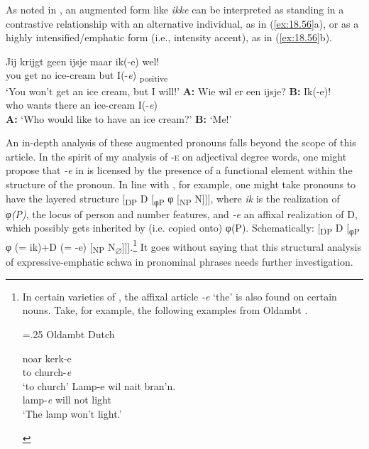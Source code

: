 \documentclass[output=paper]{langsci/langscibook}
\begin{document}
As noted in \citet{Zwart2001}, an augmented form like \emph{ikke} can be
interpreted as standing in a contrastive relationship with an alternative
individual, as in (\ref{ex:18.56}a), or as a highly intensified/emphatic
form (i.e., intensity accent), as in (\ref{ex:18.56}b).

\ea%
    \label{ex:18.56}
	\ea
	\gll Jij   krijgt    geen  ijsje            maar  ik(-e)    wel!\\
		you  get        no      ice-cream  but      I(-\emph{e})      \Ptcl{}\textsubscript{positive}\\
	\glt \enquote*{You won}t get an ice cream, but I will!'
	\ex
	\gll \textbf{A:} Wie    wil        er        een    ijsje?            \textbf{B:}  Ik(-e)!\\
		{}  who    wants    there  an    ice-cream    {}  I(-\emph{e})\\
	\glt \textbf{A:} \enquote*{Who would like to have an ice cream?} \textbf{B:} \enquote*{Me!}
	\z
\z

An in-depth analysis of these augmented pronouns falls beyond the scope of this
article. In the spirit of my analysis of \textsc{-e} on adjectival degree
words, one might propose that \emph{-e} in  is licensed by the
presence of a functional element within the structure of the pronoun. In line
with \citet{DechWil2002}, for example, one might take pronouns to
have the layered structure [\textsubscript{DP} D [\textsubscript{φP} φ
[\textsubscript{NP} N]]], where \emph{ik} is the realization of \emph{φ(P)},
the locus of person and number features, and \emph{-e} an affixal realization
of D, which possibly gets inherited by (i.e. copied onto) φ(P). Schematically:
[\textsubscript{DP} D [\textsubscript{φP} φ (= ik)+D (= -e) [\textsubscript{NP}
N\textsubscript{${\varnothing}$}]]].\footnote{In certain varieties of
    , the affixal article \emph{-e} \enquote*{the} is also found on
    certain nouns. Take, for example, the following examples from Oldambt
     \citep[101]{Schuringa1923}.

\begin{exe}
    \multicolsep=.25\baselineskip
     Oldambt Dutch
    \begin{multicols}{2}\begin{xlist}
    \ex
	\gll noar kerk-e\\
		to church-\emph{e}\\
	\glt \enquote*{to church}
	\ex
	\gll  Lamp-e wil nait bran'n.\\
		lamp-\emph{e} will not light \\
	\glt \enquote*{The lamp won't light.}
    \end{xlist}
    \end{multicols}
\end{exe}} It goes without saying that this structural analysis of
expressive-emphatic schwa in pronominal phrases needs further investigation.
\end{document}

